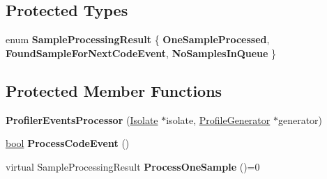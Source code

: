 \subsection*{Protected Types}
\begin{DoxyCompactItemize}
\item 
\mbox{\label{classv8_1_1internal_1_1ProfilerEventsProcessor_a1e04e270f39aeb3c99488ce1e65eb154}} 
enum {\bfseries Sample\+Processing\+Result} \{ {\bfseries One\+Sample\+Processed}, 
{\bfseries Found\+Sample\+For\+Next\+Code\+Event}, 
{\bfseries No\+Samples\+In\+Queue}
 \}
\end{DoxyCompactItemize}
\subsection*{Protected Member Functions}
\begin{DoxyCompactItemize}
\item 
\mbox{\label{classv8_1_1internal_1_1ProfilerEventsProcessor_ac97a9f2b4651c33e207453fcb0947f04}} 
{\bfseries Profiler\+Events\+Processor} (\mbox{\hyperlink{classv8_1_1internal_1_1Isolate}{Isolate}} $\ast$isolate, \mbox{\hyperlink{classv8_1_1internal_1_1ProfileGenerator}{Profile\+Generator}} $\ast$generator)
\item 
\mbox{\label{classv8_1_1internal_1_1ProfilerEventsProcessor_af06c8e8eb22d0da1dc1e9edbbabca0d2}} 
\mbox{\hyperlink{classbool}{bool}} {\bfseries Process\+Code\+Event} ()
\item 
\mbox{\label{classv8_1_1internal_1_1ProfilerEventsProcessor_a8b6ed3e332602e2156a60de8fbb30ff9}} 
virtual Sample\+Processing\+Result {\bfseries Process\+One\+Sample} ()=0
\end{DoxyCompactItemize}
